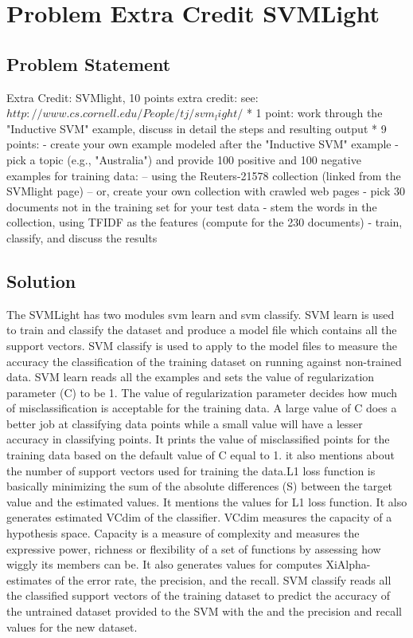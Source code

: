 \documentclass[12pt]{report}
\begin{document}
\chapter{Problem Extra Credit SVMLight}
\section{Problem Statement}      
Extra Credit: SVMlight, 10 points extra credit:
see: $http://www.cs.cornell.edu/People/tj/svm_light/$
* 1 point:
work through the "Inductive SVM" example, discuss in detail the steps and resulting output
* 9 points: 
- create your own example modeled after the "Inductive SVM" example
- pick a topic (e.g., "Australia") and provide 100 positive and 100 negative examples for training data:
  -- using the Reuters-21578 collection (linked from the SVMlight page)
  -- or, create your own collection with crawled web pages 
- pick 30 documents not in the training set for your test data
- stem the words in the collection, using TFIDF as the features (compute for the 230 documents)
- train, classify, and discuss the results
\section{Solution}
The SVMLight has two modules svm learn and svm classify. SVM learn is used to  train and classify the dataset and produce a model file which contains all the support vectors. SVM classify is used to apply to the model files to measure the accuracy the classification of  the training dataset on running against non-trained data. SVM learn reads all the examples and sets the value of  regularization parameter (C) to be 1. The value of regularization parameter decides how much of misclassification is acceptable for the training data. A large value of C does a better job at classifying data points while a small value will have a lesser accuracy in classifying points. It prints the value of misclassified points for the training data based on the default value of C equal to 1. it also mentions about the number of support vectors used for training the data.L1 loss function is basically minimizing the sum of the absolute differences (S) between the target value and the estimated values. It mentions the values for L1 loss function. It also generates estimated VCdim of the classifier. VCdim measures the capacity of a hypothesis space. Capacity is a measure of complexity and measures the expressive power, richness or flexibility of a set of functions by  assessing how wiggly its members can be.  It also generates values for computes XiAlpha-estimates of the error rate, the precision, and the recall. SVM classify reads all the classified support vectors of the training dataset to predict the accuracy of the untrained dataset provided to the SVM with the and the precision and recall values for the new dataset.
\end{document}
